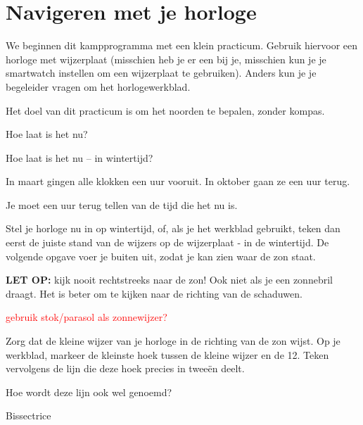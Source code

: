 \chapter{Navigeren met je horloge}

We beginnen dit kampprogramma met een klein practicum. Gebruik hiervoor een horloge met wijzerplaat (misschien heb je er een bij je, misschien kun je je smartwatch instellen om een wijzerplaat te gebruiken). Anders kun je je begeleider vragen om het horlogewerkblad.

Het doel van dit practicum is om het noorden te bepalen, zonder kompas.

\begin{opgave}[\vinger]
    \begin{subopgave}
        Hoe laat is het nu?
    \end{subopgave}
    \begin{subopgave}
        Hoe laat is het nu -- in wintertijd?
        \begin{hint}
            In maart gingen alle klokken een uur vooruit. In oktober gaan ze een uur terug. 
        \end{hint}
        \begin{antwoord}
            Je moet een uur terug tellen van de tijd die het nu is.
        \end{antwoord}
    \end{subopgave}
\end{opgave}

Stel je horloge nu in op wintertijd, of, als je het werkblad gebruikt, teken dan eerst de juiste stand van de wijzers op de wijzerplaat - in de wintertijd. De volgende opgave voer je buiten uit, zodat je kan zien waar de zon staat.

\textbf{LET OP:} kijk nooit rechtstreeks naar de zon! Ook niet als je een zonnebril draagt. Het is beter om te kijken naar de richting van de schaduwen.

\textcolor{red}{gebruik stok/parasol als zonnewijzer?}

\begin{opgave}[\schaar]
    Zorg dat de kleine wijzer van je horloge in de richting van de zon wijst. Op je werkblad, markeer de kleinste hoek tussen de kleine wijzer en de 12. Teken vervolgens de lijn die deze hoek precies in twee\"{e}n deelt.
\end{opgave}

\begin{opgave}
    Hoe wordt deze lijn ook wel genoemd? 
    \begin{antwoord}
         Bissectrice
    \end{antwoord}
\end{opgave}

